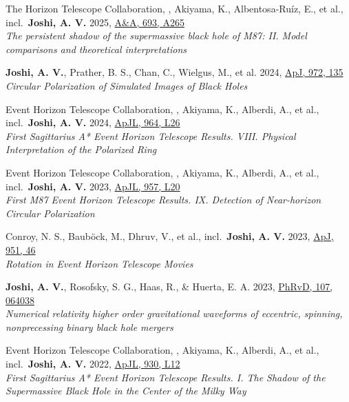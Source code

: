 \item The Horizon Telescope Collaboration, , Akiyama, K., Albentosa-Ruíz, E., et al., incl.\ \textbf{Joshi, A. V.} 2025, \href{https://ui.adsabs.harvard.edu/abs/2025A\&A...693A.265E}{A\&A, 693, A265}\\\textit{The persistent shadow of the supermassive black hole of M87: II. Model comparisons and theoretical interpretations}

\item \textbf{Joshi, A. V.}, Prather, B. S., Chan, C., Wielgus, M., et al. 2024, \href{https://ui.adsabs.harvard.edu/abs/2024ApJ...972..135J}{ApJ, 972, 135}\\\textit{Circular Polarization of Simulated Images of Black Holes}

\item Event Horizon Telescope Collaboration, , Akiyama, K., Alberdi, A., et al., incl.\ \textbf{Joshi, A. V.} 2024, \href{https://ui.adsabs.harvard.edu/abs/2024ApJ...964L..26E}{ApJL, 964, L26}\\\textit{First Sagittarius A* Event Horizon Telescope Results. VIII. Physical Interpretation of the Polarized Ring}

\item Event Horizon Telescope Collaboration, , Akiyama, K., Alberdi, A., et al., incl.\ \textbf{Joshi, A. V.} 2023, \href{https://ui.adsabs.harvard.edu/abs/2023ApJ...957L..20E}{ApJL, 957, L20}\\\textit{First M87 Event Horizon Telescope Results. IX. Detection of Near-horizon Circular Polarization}

\item Conroy, N. S., Bauböck, M., Dhruv, V., et al., incl.\ \textbf{Joshi, A. V.} 2023, \href{https://ui.adsabs.harvard.edu/abs/2023ApJ...951...46C}{ApJ, 951, 46}\\\textit{Rotation in Event Horizon Telescope Movies}

\item \textbf{Joshi, A. V.}, Rosofsky, S. G., Haas, R., \& Huerta, E. A. 2023, \href{https://ui.adsabs.harvard.edu/abs/2023PhRvD.107f4038J}{PhRvD, 107, 064038}\\\textit{Numerical relativity higher order gravitational waveforms of eccentric, spinning, nonprecessing binary black hole mergers}

\item Event Horizon Telescope Collaboration, , Akiyama, K., Alberdi, A., et al., incl.\ \textbf{Joshi, A. V.} 2022, \href{https://ui.adsabs.harvard.edu/abs/2022ApJ...930L..12E}{ApJL, 930, L12}\\\textit{First Sagittarius A* Event Horizon Telescope Results. I. The Shadow of the Supermassive Black Hole in the Center of the Milky Way}


